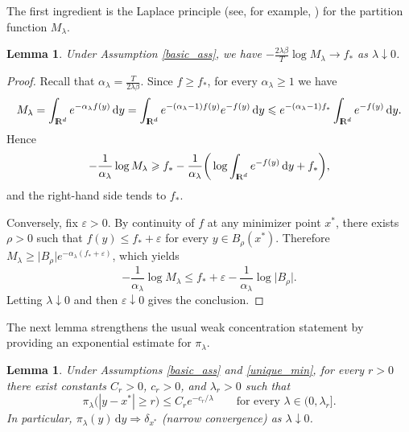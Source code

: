 \documentclass[11pt]{amsart}
\def\R{\mathrm{I\kern-0.21emR}}
\newcommand{\dd}{\,\mathrm{d}}
\renewcommand{\geq}{\geqslant}
\renewcommand{\leq}{\leqslant}
\renewcommand{\Vert}{|}
\numberwithin{equation}{section}
\numberwithin{figure}{section}
\newtheorem{lemma}[theorem]{Lemma}%
\theoremstyle{definition}\newtheorem{remark}[theorem]{Remark}%
\begin{document}
The first ingredient is the Laplace principle (see, for example, \cite{Hwang80,DemboZeitouni}) for the partition function $M_\lambda$.

\begin{lemma}\label{partition_laplace}
Under Assumption \ref{basic_ass}, we have $- \frac{2\lambda\beta}{T}\log M_\lambda \to f_*$ as $\lambda \downarrow 0$.
\end{lemma}

\begin{proof}
Recall that $\alpha_\lambda = \frac{T}{2\lambda\beta}$. Since $f \geq f_*$, for every $\alpha_\lambda \geq 1$ we have
$$
M_\lambda
=
\int_{\R^d} e^{-\alpha_\lambda f(y)}\dd y
=
\int_{\R^d} e^{-(\alpha_\lambda - 1)f(y)}e^{-f(y)}\dd y
\leq
e^{-(\alpha_\lambda - 1)f_*}\int_{\R^d} e^{-f(y)}\dd y.
$$
Hence
$$
- \frac{1}{\alpha_\lambda}\log M_\lambda \geq f_* - \frac{1}{\alpha_\lambda}\bigg( \log \int_{\R^d} e^{-f(y)}\dd y + f_* \bigg),
$$
and the right-hand side tends to $f_*$.

Conversely, fix $\varepsilon > 0$. By continuity of $f$ at any minimizer point $x^*$, there exists $\rho > 0$ such that $f(y) \leq f_* + \varepsilon$ for every $y \in B_\rho(x^*)$.
Therefore $M_\lambda \geq \vert B_\rho \vert e^{-\alpha_\lambda(f_* + \varepsilon)}$, which yields
$$
- \frac{1}{\alpha_\lambda}\log M_\lambda \leq f_* + \varepsilon - \frac{1}{\alpha_\lambda}\log \vert B_\rho \vert.
$$
Letting $\lambda \downarrow 0$ and then $\varepsilon \downarrow 0$ gives the conclusion.
\end{proof}

The next lemma strengthens the usual weak concentration statement by providing an exponential estimate for $\pi_\lambda$.

\begin{lemma}\label{gibbs_concentration}
Under Assumptions \ref{basic_ass} and \ref{unique_min}, for every $r > 0$ there exist constants $C_r > 0$, $c_r > 0$, and $\lambda_r > 0$ such that
$$
\pi_\lambda\big( \Vert y - x^* \Vert \geq r \big) \leq C_r e^{-c_r/\lambda}
\qquad
\text{for every } \lambda \in (0,\lambda_r].
$$
In particular, $\pi_\lambda(y)\dd y \Rightarrow \delta_{x^*}$ (narrow convergence) as $\lambda \downarrow 0$.
\end{lemma}
\end{document}
